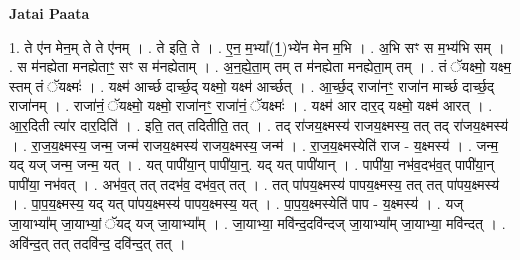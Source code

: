 \documentclass[17pt]{extarticle}
\begin{document}
\textbf{Jatai Paata} \newline

1. ते ए॑न मेन॒म् ते ते ए॑नम् । . ते इति॒ ते । . ए॒न॒ म॒भ्या᳚(1॒)भ्ये॑न मेन म॒भि । . अ॒भि सꣳ स म॒भ्य॑भि सम् । . स म॑नह्येता मनह्येताꣳ॒॒ सꣳ स म॑नह्येताम् । . अ॒न॒ह्ये॒ता॒म् तम् त म॑नह्येता मनह्येता॒म् तम् । . तं ॅयक्ष्मो॒ यक्ष्म॒ स्तम् तं ॅयक्ष्मः॑ । . यक्ष्म॑ आर्च्छ दार्च्छ॒द् यक्ष्मो॒ यक्ष्म॑ आर्च्छत् । . आ॒र्च्छ॒द् राजा॑नꣳ॒॒ राजा॑न मार्च्छ दार्च्छ॒द् राजा॑नम् । . राजा॑नं॒ ॅयक्ष्मो॒ यक्ष्मो॒ राजा॑नꣳ॒॒ राजा॑नं॒ ॅयक्ष्मः॑ । . यक्ष्म॑ आर दार॒द् यक्ष्मो॒ यक्ष्म॑ आरत् । . आ॒र॒दिती त्या॑र दार॒दिति॑ । . इति॒ तत् तदितीति॒ तत् । . तद् रा॑जय॒क्ष्मस्य॑ राजय॒क्ष्मस्य॒ तत् तद् रा॑जय॒क्ष्मस्य॑ । . रा॒ज॒य॒क्ष्मस्य॒ जन्म॒ जन्म॑ राजय॒क्ष्मस्य॑ राजय॒क्ष्मस्य॒ जन्म॑ । . रा॒ज॒य॒क्ष्मस्येति॑ राज - य॒क्ष्मस्य॑ । . जन्म॒ यद् यज् जन्म॒ जन्म॒ यत् । . यत् पापी॑या॒न् पापी॑या॒न्॒. यद् यत् पापी॑यान् । . पापी॑या॒ नभ॑व॒दभ॑व॒त् पापी॑या॒न् पापी॑या॒ नभ॑वत् । . अभ॑व॒त् तत् तदभ॑व॒ दभ॑व॒त् तत् । . तत् पा॑पय॒क्ष्मस्य॑ पापय॒क्ष्मस्य॒ तत् तत् पा॑पय॒क्ष्मस्य॑ । . पा॒प॒य॒क्ष्मस्य॒ यद् यत् पा॑पय॒क्ष्मस्य॑ पापय॒क्ष्मस्य॒ यत् । . पा॒प॒य॒क्ष्मस्येति॑ पाप - य॒क्ष्मस्य॑ । . यज् जा॒याभ्या᳚म् जा॒याभ्यां॒ ॅयद् यज् जा॒याभ्या᳚म् । . जा॒याभ्या॒ मवि॑न्द॒दवि॑न्दज् जा॒याभ्या᳚म् जा॒याभ्या॒ मवि॑न्दत् । . अवि॑न्द॒त् तत् तदवि॑न्द॒ दवि॑न्द॒त् तत् । \newline
\end{document}
